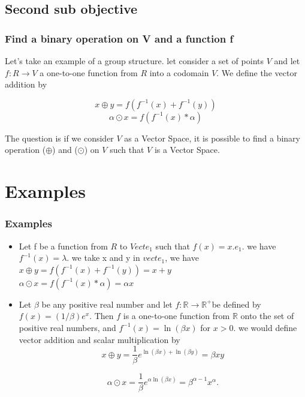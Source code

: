 \documentclass{beamer}
\begin{document}
\subsection{Second sub objective}
\begin{frame}
    \frametitle{Find a binary operation on V and a function f }
	Let's take an example of a group structure.
	let consider a set of points  $ V $ and let  $ f: R \rightarrow V $ a one-to-one
	function from $R$ into a codomain $V$. We define the vector addition by
	
    $$ x \oplus y = f(f^{-1}(x) + f^{-1}(y)) $$
    $$ \alpha \odot x = f(f^{-1}(x) * \alpha) $$

	The question is if we consider $V$ as a Vector Space, it is possible to find a binary operation ($\oplus$) and ($\odot$) on $V$ such that $V$ is a Vector Space.
	
\end{frame}



\section{Examples}
\begin{frame}
    \frametitle{Examples}
    \begin{itemize}
        \item Let f be a function from $R$ to $Vect{e_1}$ such that $f(x) = x.e_1$.
        we have $f^{-1}(x) = \lambda$.
            we take x and y in $vect{e_1}$, we have \\
            $x\oplus y = f(f^{-1}(x) + f^{-1}(y)) = x + y$ \\
            $\alpha \odot x = f(f^{-1}(x) * \alpha) = \alpha x$
            \item Let $\beta$ be any positive real number and let $f: \mathbb{R} \rightarrow \mathbb{R}^{+}$be defined by $f(x)=(1 / \beta) e^x$. Then $f$ is a one-to-one function from $\mathbb{R}$ onto the set of positive real numbers, and $f^{-1}(x)=\ln (\beta x)$ for $x>0$. we would define vector addition and scalar multiplication by
            $$
            x \oplus y=\frac{1}{\beta} e^{\ln (\beta x)+\ln (\beta y)}=\beta x y
            $$ 
            
            $$
            \alpha \odot x=\frac{1}{\beta} e^{\alpha \ln (\beta x)}=\beta^{\alpha-1} x^\alpha.
            $$ 
        \end{itemize}
    \end{frame}
\end{document}
